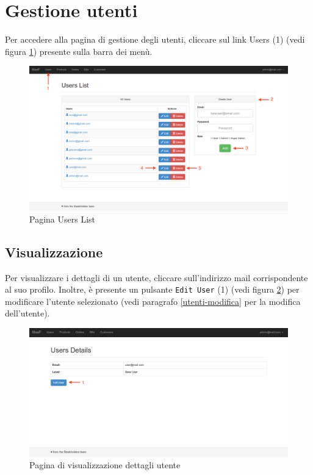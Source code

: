 \section{Gestione utenti}
\label{gestioneutenti}
Per accedere alla pagina di gestione degli utenti, cliccare sul link Users (1) (vedi figura \ref{fig:users}) presente sulla barra dei menù.

\begin{figure}[H]
\label{fig:users}
	\centering \includegraphics[width=1\textwidth]{img/users.png}
	\caption{Pagina Users List}
\end{figure}


	\subsection{Visualizzazione}
	\label{utenti-visualizzazione}
	Per visualizzare i dettagli di un utente, cliccare sull'indirizzo mail corrispondente al suo profilo. Inoltre, è presente un pulsante \texttt{Edit User} (1) (vedi figura \ref{fig:visualizzautente}) per modificare l'utente selezionato (vedi paragrafo \ref{utenti-modifica} per la modifica dell'utente).

	\begin{figure}[H]
	\label{fig:visualizzautente}
		\centering \includegraphics[width=1\textwidth]{img/visualizza-utente.png}
		\caption{Pagina di visualizzazione dettagli utente}
	\end{figure}

